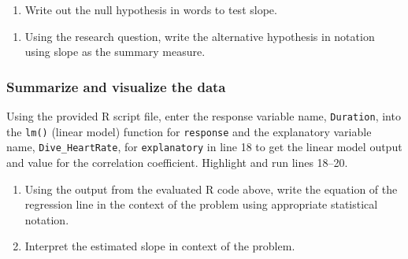 \documentclass[
]{report}
\newenvironment{Shaded}{\begin{snugshade}}{\end{snugshade}}
\newcommand{\AttributeTok}[1]{\textcolor[rgb]{0.77,0.63,0.00}{#1}}
\newcommand{\CommentTok}[1]{\textcolor[rgb]{0.56,0.35,0.01}{\textit{#1}}}
\newcommand{\DecValTok}[1]{\textcolor[rgb]{0.00,0.00,0.81}{#1}}
\newcommand{\FunctionTok}[1]{\textcolor[rgb]{0.00,0.00,0.00}{#1}}
\newcommand{\NormalTok}[1]{#1}
\newcommand{\OtherTok}[1]{\textcolor[rgb]{0.56,0.35,0.01}{#1}}
\newcommand{\SpecialCharTok}[1]{\textcolor[rgb]{0.00,0.00,0.00}{#1}}
\providecommand{\tightlist}{%
  \setlength{\itemsep}{0pt}\setlength{\parskip}{0pt}}
\begin{document}
\begin{enumerate}
\def\labelenumi{\arabic{enumi}.}
\setcounter{enumi}{3}
\tightlist
\item
  Write out the null hypothesis in words to test slope.
\end{enumerate}

\vspace{1in}

\begin{enumerate}
\def\labelenumi{\arabic{enumi}.}
\setcounter{enumi}{4}
\tightlist
\item
  Using the research question, write the alternative hypothesis in notation using slope as the summary measure.
\end{enumerate}

\vspace{0.5in}

\hypertarget{summarize-and-visualize-the-data-5}{%
\subsubsection*{Summarize and visualize the data}\label{summarize-and-visualize-the-data-5}}

Using the provided R script file, enter the response variable name, \texttt{Duration}, into the \texttt{lm()} (linear model) function for \texttt{response} and the explanatory variable name, \texttt{Dive\_HeartRate}, for \texttt{explanatory} in line 18 to get the linear model output and value for the correlation coefficient. Highlight and run lines 18--20.

\begin{Shaded}
\end{Shaded}

\begin{enumerate}
\def\labelenumi{\arabic{enumi}.}
\setcounter{enumi}{5}
\item
  Using the output from the evaluated R code above, write the equation of the regression line in the context of the problem using appropriate statistical notation.
  \vspace{1in}
\item
  Interpret the estimated slope in context of the problem.
\end{enumerate}
\end{document}
